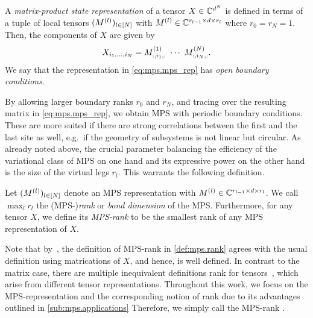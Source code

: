 \begin{definition}%
  \label{def:mps.mps}
  A \emph{matrix-product state representation} of a tensor $X \in {\mathbb{C}}^{d^N}$ is defined in terms of a tuple of local tensors $(M^{(l)})_{l \in [N]}$ with $M^{(l)} \in {\mathbb{C}}^{r_{l - 1} \times d \times r_l}$ where $r_0 = r_N = 1$.
  Then, the components of $X$ are given by
  \[
    \label{eq:mps.mps_rep}
    X_{i_1,\ldots,i_N} = M\ind{1}_{:,i_1,:}\ \cdots\  M\ind{N}_{:,i_N,:}.
  \]
  We say that the representation in \cref{eq:mps.mps_rep} has \emph{open boundary conditions}.
\end{definition}

By allowing larger boundary ranks $r_0$ and $r_N$, and tracing over the resulting matrix in \cref{eq:mps.mps_rep}, we obtain MPS with periodic boundary conditions.
These are more suited if there are strong correlations between the first and the last site as well, e.g.\ if the geometry of subsystems is not linear but circular.
As already noted above, the crucial parameter balancing the efficiency of the variational class of MPS on one hand and its expressive power on the other hand is the size of the virtual legs $r_l$.
This warrants the following definition.

\begin{definition}%
  \label{def:mps.rank}
  Let $(M^{(l)})_{l \in [N]}$ denote an MPS representation with $M^{(l)} \in {\mathbb{C}}^{r_{l - 1} \times d \times r_l}$.
  We call $\max_l r_l$ the (MPS-)\emph{rank} or \emph{bond dimension} of the MPS.
  Furthermore, for any tensor $X$, we define its \emph{MPS-rank} to be the smallest rank of any MPS representation of $X$.
\end{definition}

Note that by~\cite[Thm.\ 2.2]{Oseledets_2011_TensorTrain}, the definition of MPS-rank in \cref{def:mps.rank} agrees with the usual definition using matrications of $X$, and hence, is well defined.
In contrast to the matrix case, there are multiple inequivalent definitions rank for tensors~\cite{???}, which arise from different tensor representations.
Throughout this work, we focus on the MPS-representation and the corresponding notion of rank due to its advantages outlined in \cref{sub:mps.applications}
Therefore, we simply call the MPS-rank .\\



